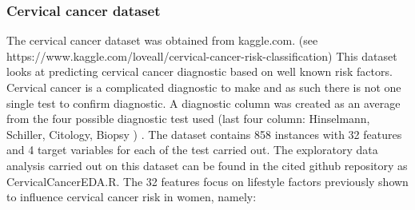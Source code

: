 \subsubsection{Cervical cancer dataset}
The cervical cancer dataset was obtained from kaggle.com. \newline
(see https://www.kaggle.com/loveall/cervical-cancer-risk-classification)\newline
This dataset looks at predicting cervical cancer diagnostic based on well known risk factors. Cervical cancer is a complicated diagnostic to make and as such there is not one single test to confirm diagnostic. A diagnostic column was created as an average from the four possible diagnostic test used  (last four column: Hinselmann, Schiller, Citology, Biopsy ) \citep{Fernandes:2017td, Wu:2017fa}.\newline
The dataset contains 858 instances with 32 features and 4 target variables for each of the test carried out.
The exploratory data analysis carried out on this dataset can be found in the cited github repository as CervicalCancerEDA.R.
The 32 features focus on lifestyle factors previously shown to influence cervical cancer risk in women, namely:
